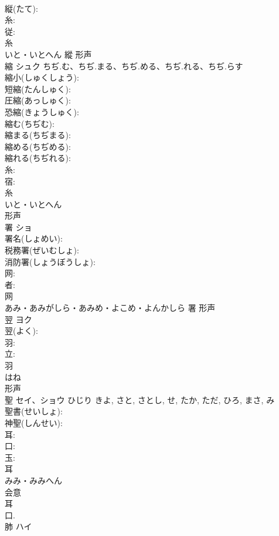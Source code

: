 \documentclass[8pt]{extreport}
\begin{document}
\begin{CJK}{UTF8}{min}
\\	縦(たて): 
\\	糸: 
\\	従: 
\\	糸	
\\	いと・いとへん	縱	形声 
\\	縮	シュク	ちぢ.む、ちぢ.まる、ちぢ.める、ちぢ.れる、ちぢ.らす		
\\	縮小(しゅくしょう): 
\\	短縮(たんしゅく): 
\\	圧縮(あっしゅく): 
\\	恐縮(きょうしゅく): 
\\	縮む(ちぢむ): 
\\	縮まる(ちぢまる): 
\\	縮める(ちぢめる): 
\\	縮れる(ちぢれる): 
\\	糸: 
\\	宿: 
\\	糸	
\\	いと・いとへん	
\\	形声 
\\	署	ショ			
\\	署名(しょめい): 
\\	税務署(ぜいむしょ): 
\\	消防署(しょうぼうしょ): 
\\	网: 
\\	者: 
\\	网	
\\	あみ・あみがしら・あみめ・よこめ・よんかしら	署	形声 
\\	翌	ヨク			
\\	翌(よく): 
\\	羽: 
\\	立: 
\\	羽	
\\	はね	
\\	形声 
\\	聖	セイ、ショウ	ひじり	きよ, さと, さとし, せ, たか, ただ, ひろ, まさ, み	
\\	聖書(せいしょ): 
\\	神聖(しんせい): 
\\	耳: 
\\	口: 
\\	玉: 
\\	耳	
\\	みみ・みみへん	
\\	会意 
\\	耳 
\\	口. 
\\	肺	ハイ			

\end{CJK}
\end{document}
